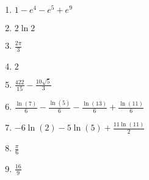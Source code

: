\begin{enumerate}
\begin{multicols}{2}
\begin{enumerate}[label*=\arabic*.]
            \item  ${1 - e^4 - e^5 + e^9}$
            \item  ${2 \ln 2}$
            \item  ${\frac{2\pi}{3}}$
            \item  ${2}$
            \item  ${\frac{422}{15} - \frac{10\sqrt{5}}{3}}$
            \item  ${\frac{\ln\! \left(7\right)}{6}-\frac{\ln\! \left(5\right)}{6}-\frac{\ln\! \left(13\right)}{6}+\frac{\ln\! \left(11\right)}{6}}$
            \item  ${-6 \ln\! \left(2\right)-5 \ln\! \left(5\right)+\frac{11 \ln\! \left(11\right)}{2}}$
            \item  ${\frac{\pi}{6}}$
            \item  ${\frac{16}{9}}$
        \end{enumerate}
    \end{multicols}
\end{enumerate}
